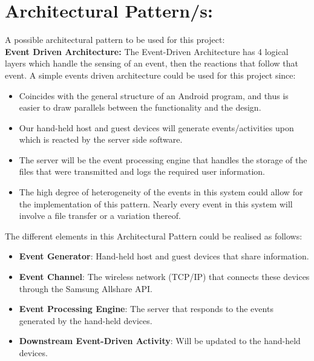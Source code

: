 \documentclass[12pt]{article}
\begin{document}
\section{Architectural Pattern/s:}
A possible architectural pattern to be used for this project:
\\ \textbf{Event Driven Architecture:}
The Event-Driven Architecture has 4 logical layers which handle the sensing of an event, then the reactions that follow that event. 
A simple events driven architecture could be used for this project since:
\begin{itemize}
\item Coincides with the general structure of an Android program, and thus is easier to draw parallels between the functionality and the design.
\item Our hand-held host and guest devices will generate events/activities upon which is reacted by the server side software.
\item The server will be the event processing engine that handles the storage of the files that were transmitted and logs the required user information.
\item The high degree of heterogeneity of the events in this system could allow for the implementation of this pattern. Nearly every event in this system will involve a file transfer or a variation thereof. 
\end{itemize}
The different elements in this Architectural Pattern could be realised as follows:
\begin{itemize}
\item \textbf{Event Generator}: Hand-held host and guest devices that share information.
\item \textbf{Event Channel}: The wireless network (TCP/IP) that connects these devices through the Samsung Allshare API.
\item \textbf{Event Processing Engine}: The server that responds to the events generated by the hand-held devices.
\item \textbf{Downstream Event-Driven Activity}: Will be updated to the hand-held devices.
\end{itemize}


\newpage
\end{document}
